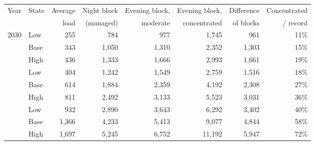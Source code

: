 \begin{tabular}{@{}llrrrrrr@{}}
\toprule
Year & State & Average & Night block & Evening block, & Evening block, & Difference & Concentrated \\
 & & load & (managed) & moderate & concentrated & of blocks & / record \\
\midrule
2030 & Low & 255 & 784 & 977 & 1,745 & 961 & 11\% \\
 & Base & 343 & 1,050 & 1,310 & 2,352 & 1,303 & 15\% \\
 & High & 436 & 1,333 & 1,666 & 2,993 & 1,661 & 19\% \\
\addlinespace
2035 & Low & 404 & 1,242 & 1,549 & 2,759 & 1,516 & 18\% \\
 & Base & 614 & 1,884 & 2,359 & 4,192 & 2,308 & 27\% \\
 & High & 811 & 2,492 & 3,133 & 5,523 & 3,031 & 36\% \\
\addlinespace
2050 & Low & 932 & 2,890 & 3,643 & 6,292 & 3,402 & 40\% \\
 & Base & 1,366 & 4,233 & 5,413 & 9,077 & 4,844 & 58\% \\
 & High & 1,697 & 5,245 & 6,752 & 11,192 & 5,947 & 72\% \\
\bottomrule
\end{tabular}
